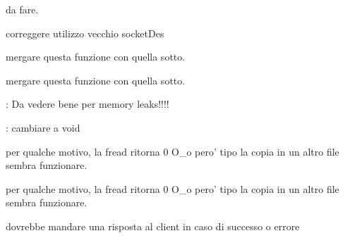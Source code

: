 
\begin{DoxyRefList}
\item[\label{todo__todo000013}%
\hypertarget{todo__todo000013}{}%
Globale \hyperlink{StruttureDati_8c_ae68c4a04beab2c3add2a48c8c8111742}{close\+Opened\+File} (int ptid)]da fare.  
\item[\label{todo__todo000010}%
\hypertarget{todo__todo000010}{}%
Globale \hyperlink{OPE_8c_af1f79690eec0a7727a519ba59a891762}{create\+Control\+Sock} (int port\+No, int socket\+Id)]correggere utilizzo vecchio socket\+Des  
\item[\label{todo__todo000006}%
\hypertarget{todo__todo000006}{}%
Globale \hyperlink{CommandsHandler_8h_a919c7f4b4bcb820f1d6566238178390e}{get\+Command\+I\+D} (char $\ast$)]mergare questa funzione con quella sotto.  
\item[\label{todo__todo000006}%
\hypertarget{todo__todo000006}{}%
Globale \hyperlink{CommandsHandler_8h_a919c7f4b4bcb820f1d6566238178390e}{get\+Command\+I\+D} (char $\ast$)]mergare questa funzione con quella sotto.  
\item[\label{todo__todo000009}%
\hypertarget{todo__todo000009}{}%
Globale \hyperlink{OPE_8c_a6eccb6ec6ec9c8375e70ab4088b511a5}{handle\+Open\+Command} (char $\ast$command, int socket)]\+: Da vedere bene per memory leaks!!!!  
\item[\label{todo__todo000004}%
\hypertarget{todo__todo000004}{}%
Globale \hyperlink{Server_2CLOSE_8c_a29faf0797a0c5b3d36a86e72cc023d85}{handle\+Writes} (int number\+Of\+Changes, \hyperlink{structOpenedFile}{Opened\+File} $\ast$id)]\+: cambiare a void  
\item[\label{todo__todo000002}%
\hypertarget{todo__todo000002}{}%
Globale \hyperlink{Client_2READ_8c_aa4b63039ca9686f5666ce6bbb33317d7}{mydfs\+\_\+read} (\hyperlink{structMyDFSId}{My\+D\+F\+S\+Id} $\ast$id, int pos, void $\ast$ptr, unsigned int size)]per qualche motivo, la fread ritorna 0 O\+\_\+o pero' tipo la copia in un altro file sembra funzionare.  
\item[\label{todo__todo000002}%
\hypertarget{todo__todo000002}{}%
Globale \hyperlink{Client_2READ_8c_aa4b63039ca9686f5666ce6bbb33317d7}{mydfs\+\_\+read} (\hyperlink{structMyDFSId}{My\+D\+F\+S\+Id} $\ast$id, int pos, void $\ast$ptr, unsigned int size)]per qualche motivo, la fread ritorna 0 O\+\_\+o pero' tipo la copia in un altro file sembra funzionare.  
\item[\label{todo__todo000008}%
\hypertarget{todo__todo000008}{}%
File \hyperlink{OPE_8c}{O\+P\+E.c} ]dovrebbe mandare una risposta al client in caso di successo o errore 


\end{DoxyRefList}
